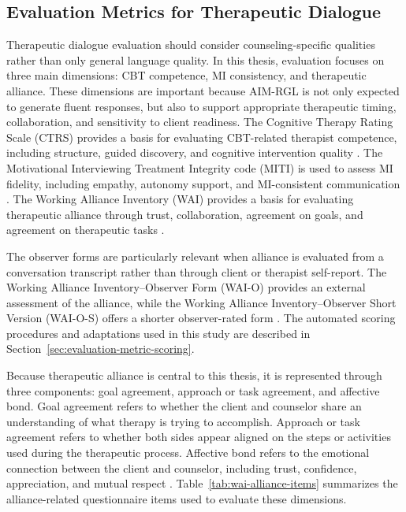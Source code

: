 \subsection{Evaluation Metrics for Therapeutic Dialogue}
\label{sec:therapeutic-dialogue-metrics}

Therapeutic dialogue evaluation should consider counseling-specific qualities rather than only general language quality. In this thesis, evaluation focuses on three main dimensions: CBT competence, MI consistency, and therapeutic alliance. These dimensions are important because AIM-RGL is not only expected to generate fluent responses, but also to support appropriate therapeutic timing, collaboration, and sensitivity to client readiness. The Cognitive Therapy Rating Scale (CTRS) provides a basis for evaluating CBT-related therapist competence, including structure, guided discovery, and cognitive intervention quality \cite{young1980cognitive,beckinstitute2021ctrs}. The Motivational Interviewing Treatment Integrity code (MITI) is used to assess MI fidelity, including empathy, autonomy support, and MI-consistent communication \cite{moyers2016miti,moyers2015miti421}. The Working Alliance Inventory (WAI) provides a basis for evaluating therapeutic alliance through trust, collaboration, agreement on goals, and agreement on therapeutic tasks \cite{horvath1989wai,hatcher2006wai}.

The observer forms are particularly relevant when alliance is evaluated from a conversation transcript rather than through client or therapist self-report. The Working Alliance Inventory--Observer Form (WAI-O) provides an external assessment of the alliance, while the Working Alliance Inventory--Observer Short Version (WAI-O-S) offers a shorter observer-rated form \cite{tichenor1989alliance,santirso2018waios}. The automated scoring procedures and adaptations used in this study are described in Section~\ref{sec:evaluation-metric-scoring}.

Because therapeutic alliance is central to this thesis, it is represented through three components: goal agreement, approach or task agreement, and affective bond. Goal agreement refers to whether the client and counselor share an understanding of what therapy is trying to accomplish. Approach or task agreement refers to whether both sides appear aligned on the steps or activities used during the therapeutic process. Affective bond refers to the emotional connection between the client and counselor, including trust, confidence, appreciation, and mutual respect \cite{bordin1979alliance,horvath1989wai,hatcher2006wai}. Table~\ref{tab:wai-alliance-items} summarizes the alliance-related questionnaire items used to evaluate these dimensions.

